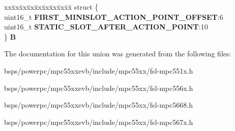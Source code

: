 \begin{DoxyCompactItemize}
\begin{tabbing}
\end{tabbing}\item 
\mbox{\label{unionuPCR13_a0c7ce17ee2253bbbfb9dd1e1a20e0ca9}} 
\begin{tabbing}
xx\=xx\=xx\=xx\=xx\=xx\=xx\=xx\=xx\=\kill
struct \{\\
\>uint16\_t {\bfseries FIRST\_MINISLOT\_ACTION\_POINT\_OFFSET}:6\\
\>uint16\_t {\bfseries STATIC\_SLOT\_AFTER\_ACTION\_POINT}:10\\
\} {\bfseries B}\\

\end{tabbing}\end{DoxyCompactItemize}


The documentation for this union was generated from the following files\+:\begin{DoxyCompactItemize}
\item 
bsps/powerpc/mpc55xxevb/include/mpc55xx/fsl-\/mpc551x.\+h\item 
bsps/powerpc/mpc55xxevb/include/mpc55xx/fsl-\/mpc556x.\+h\item 
bsps/powerpc/mpc55xxevb/include/mpc55xx/fsl-\/mpc5668.\+h\item 
bsps/powerpc/mpc55xxevb/include/mpc55xx/fsl-\/mpc567x.\+h\end{DoxyCompactItemize}
